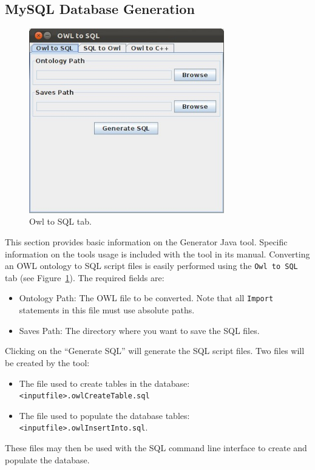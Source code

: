 \subsection{MySQL Database Generation}\label{ss:ontology2db}
\begin{figure}[h!t!]
\centering
\includegraphics[width=8.5cm]{images/OWLtoSQL001.jpeg}
\caption{Owl to SQL tab.}
\label{fig:owl2sql}
\end{figure}

This section provides basic information on the Generator Java tool. Specific information on the tools usage is included with the tool in its manual.
Converting an OWL ontology to SQL script files is easily performed using the \texttt{Owl to SQL} tab  (see Figure~\ref{fig:owl2sql}). The required fields are:

\begin{itemize}
 \item Ontology Path: The OWL file to be converted. Note that all \texttt{Import} statements in this file must use absolute paths.
 \item Saves Path: The directory where you want to save the SQL files.
\end{itemize}

Clicking on the ``Generate SQL'' will generate the SQL script files. Two files will be created by the tool:
\begin{itemize}
\item The file used to create tables in the database: \texttt{<inputfile>.owlCreateTable.sql} 
\item The file used to populate the database tables: \texttt{<inputfile>.owlInsertInto.sql}. 
\end{itemize}
These files may then be used with the SQL command line interface to create and populate the database.

